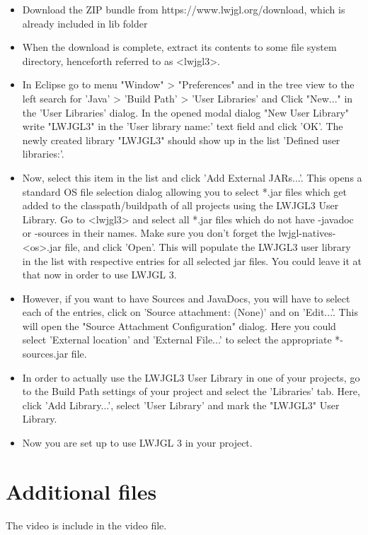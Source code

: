 \documentclass[a4paper, 11pt]{article}
\begin{document}
\begin{itemize}
   \item     Download the ZIP bundle from https://www.lwjgl.org/download, which is already included in lib folder
   \item     When the download is complete, extract its contents to some file system directory, henceforth referred to as <lwjgl3>.
   \item     In Eclipse go to menu "Window" > "Preferences" and in the tree view to the left search for 'Java' > 'Build Path' > 'User Libraries' and Click "New..." in the 'User Libraries' dialog. In the opened modal dialog "New User Library" write "LWJGL3" in the 'User library name:' text field and click 'OK'. The newly created library "LWJGL3" should show up in the list 'Defined user libraries:'.
   \item     Now, select this item in the list and click 'Add External JARs...'. This opens a standard OS file selection dialog allowing you to select *.jar files which get added to the classpath/buildpath of all projects using the LWJGL3 User Library. Go to <lwjgl3> and select all *.jar files which do not have -javadoc or -sources in their names. Make sure you don't forget the lwjgl-natives-<os>.jar file, and click 'Open'. This will populate the LWJGL3 user library in the list with respective entries for all selected jar files. You could leave it at that now in order to use LWJGL 3.
   \item     However, if you want to have Sources and JavaDocs, you will have to select each of the entries, click on 'Source attachment: (None)' and on 'Edit...'. This will open the "Source Attachment Configuration" dialog. Here you could select 'External location' and 'External File...' to select the appropriate *-sources.jar file.
   \item     In order to actually use the LWJGL3 User Library in one of your projects, go to the Build Path settings of your project and select the 'Libraries' tab. Here, click 'Add Library...', select 'User Library' and mark the "LWJGL3" User Library.
   \item     Now you are set up to use LWJGL 3 in your project.
\end{itemize}

\section*{Additional files}
    \indent The video is include in the video file.
\end{document}

